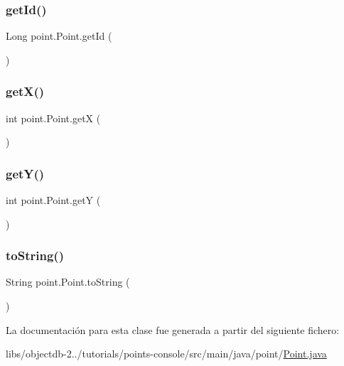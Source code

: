 \subsubsection{\texorpdfstring{getId()}{getId()}}
{\footnotesize\ttfamily Long point.\+Point.\+get\+Id (\begin{DoxyParamCaption}{ }\end{DoxyParamCaption})}

\mbox{\label{classpoint_1_1_point_a780e7bec4443bf2d4572c62f5a1f3445}} 
\subsubsection{\texorpdfstring{getX()}{getX()}}
{\footnotesize\ttfamily int point.\+Point.\+getX (\begin{DoxyParamCaption}{ }\end{DoxyParamCaption})}

\mbox{\label{classpoint_1_1_point_a9097efe451449289cd32cab0950d4658}} 
\subsubsection{\texorpdfstring{getY()}{getY()}}
{\footnotesize\ttfamily int point.\+Point.\+getY (\begin{DoxyParamCaption}{ }\end{DoxyParamCaption})}

\mbox{\label{classpoint_1_1_point_a7b5bad86b8cc82d82af500efa72deb18}} 
\subsubsection{\texorpdfstring{toString()}{toString()}}
{\footnotesize\ttfamily String point.\+Point.\+to\+String (\begin{DoxyParamCaption}{ }\end{DoxyParamCaption})}



La documentación para esta clase fue generada a partir del siguiente fichero\+:\begin{DoxyCompactItemize}
\item 
libs/objectdb-\/2../tutorials/points-\/console/src/main/java/point/\mbox{\hyperlink{_point_8java}{Point.\+java}}\end{DoxyCompactItemize}
